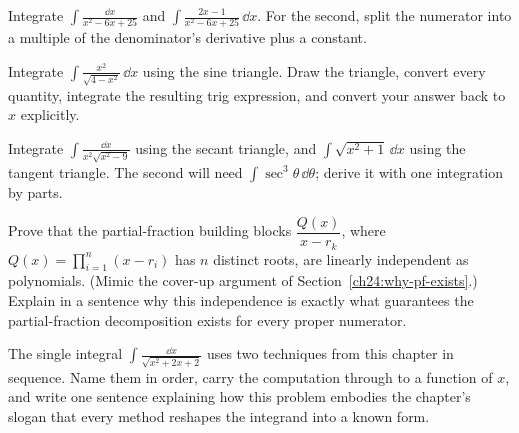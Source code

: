 \begin{exercise}
Integrate $\displaystyle \int \frac{\dd x}{x^2 - 6x + 25}$ and
$\displaystyle \int \frac{2x - 1}{x^2 - 6x + 25}\,\dd x.$ For the second, split
the numerator into a multiple of the denominator's derivative plus a constant.
\end{exercise}

\begin{exercise}
Integrate $\displaystyle \int \frac{x^2}{\sqrt{4 - x^2}}\,\dd x$ using the
sine triangle. Draw the triangle, convert every quantity, integrate the
resulting trig expression, and convert your answer back to $x$ explicitly.
\end{exercise}

\begin{exercise}
Integrate $\displaystyle \int \frac{\dd x}{x^2\sqrt{x^2 - 9}}$ using the secant
triangle, and $\displaystyle \int \sqrt{x^2 + 1}\,\dd x$ using the tangent
triangle. The second will need $\int \sec^3\theta\,\dd\theta$; derive it with
one integration by parts.
\end{exercise}

\begin{exercise}
Prove that the partial-fraction building blocks $\dfrac{Q(x)}{x - r_k}$, where
$Q(x) = \prod_{i=1}^n (x - r_i)$ has $n$ distinct roots, are linearly
independent as polynomials. (Mimic the cover-up argument of
Section~\ref{ch24:why-pf-exists}.) Explain in a sentence why this independence
is exactly what guarantees the partial-fraction decomposition exists for every
proper numerator.
\end{exercise}

\begin{exercise}[Synthesis]
The single integral $\displaystyle \int \frac{\dd x}{\sqrt{x^2 + 2x + 2}}$ uses
two techniques from this chapter in sequence. Name them in order, carry the
computation through to a function of $x$, and write one sentence explaining how
this problem embodies the chapter's slogan that every method reshapes the
integrand into a known form.
\end{exercise}
